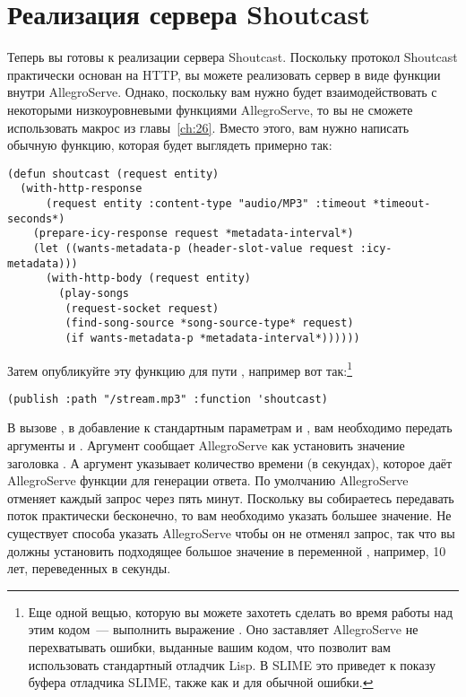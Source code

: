 \section{Реализация сервера Shoutcast}

Теперь вы готовы к реализации сервера Shoutcast. Поскольку протокол Shoutcast практически
основан на HTTP, вы можете реализовать сервер в виде функции внутри AllegroServe.  Однако,
поскольку вам нужно будет взаимодействовать с некоторыми низкоуровневыми функциями
AllegroServe, то вы не сможете использовать макрос  из
главы~\ref{ch:26}. Вместо этого, вам нужно написать обычную функцию, которая будет
выглядеть примерно так:

\begin{lstlisting}
(defun shoutcast (request entity)
  (with-http-response
      (request entity :content-type "audio/MP3" :timeout *timeout-seconds*)
    (prepare-icy-response request *metadata-interval*)
    (let ((wants-metadata-p (header-slot-value request :icy-metadata)))
      (with-http-body (request entity)
        (play-songs 
         (request-socket request)
         (find-song-source *song-source-type* request)
         (if wants-metadata-p *metadata-interval*))))))
\end{lstlisting}

Затем опубликуйте эту функцию для пути , например вот так:\footnote{Еще
  одной вещью, которую вы можете захотеть сделать во время работы над этим кодом~---
  выполнить выражение .  Оно заставляет AllegroServe
  не перехватывать ошибки, выданные вашим кодом, что позволит вам использовать стандартный
  отладчик Lisp.  В SLIME это приведет к показу буфера отладчика SLIME, также как и для
  обычной ошибки.}

\begin{lstlisting}
(publish :path "/stream.mp3" :function 'shoutcast)
\end{lstlisting}

В вызове , в добавление к стандартным параметрам  и
, вам необходимо передать аргументы  и .
Аргумент  сообщает AllegroServe как установить значение заголовка
.  А аргумент  указывает количество времени (в
секундах), которое даёт AllegroServe функции для генерации ответа. По умолчанию
AllegroServe отменяет каждый запрос через пять минут.  Поскольку вы собираетесь передавать
поток практически бесконечно, то вам необходимо указать большее значение.  Не существует
способа указать AllegroServe чтобы он не отменял запрос, так что вы должны установить
подходящее большое значение в переменной , например, 10 лет,
переведенных в секунды.

